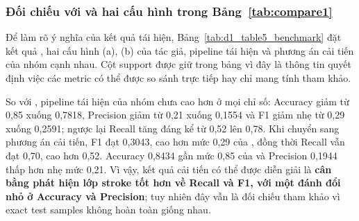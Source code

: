 \subsubsection{Đối chiếu với  và hai cấu hình trong Bảng~\ref{tab:compare1}}

Để làm rõ ý nghĩa của kết quả tái hiện, Bảng~\ref{tab:d1_table5_benchmark} đặt kết quả , hai cấu hình (a), (b) của tác giả, pipeline tái hiện và phương án cải tiến của nhóm cạnh nhau. Cột support được giữ trong bảng vì đây là thông tin quyết định việc các metric có thể được so sánh trực tiếp hay chỉ mang tính tham khảo.

\begin{table}[H]
\centering
\scriptsize
\caption{Dataset 1: đối chiếu Bảng~\ref{tab:compare1} với kết quả tái hiện và cải tiến của nhóm}
\label{tab:d1_table5_benchmark}
\end{table}

So với , pipeline tái hiện của nhóm chưa cao hơn ở mọi chỉ số: Accuracy giảm từ 0,85 xuống 0,7818, Precision giảm từ 0,21 xuống 0,1554 và F1 giảm nhẹ từ 0,29 xuống 0,2591; ngược lại Recall tăng đáng kể từ 0,52 lên 0,78. Khi chuyển sang phương án cải tiến, F1 đạt 0,3043, cao hơn mức 0,29 của , đồng thời Recall vẫn đạt 0,70, cao hơn 0,52. Accuracy 0,8434 gần mức 0,85 của  và Precision 0,1944 thấp hơn nhẹ mức 0,21. Vì vậy, kết quả cải tiến có thể được diễn giải là \textbf{cân bằng phát hiện lớp stroke tốt hơn  về Recall và F1, với một đánh đổi nhỏ ở Accuracy và Precision}; tuy nhiên đây vẫn là đối chiếu tham khảo vì exact test samples không hoàn toàn giống nhau.

